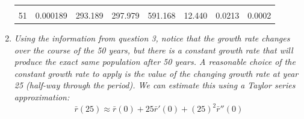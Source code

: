 \documentclass[]{book}
\begin{document}
\begin{enumerate}
\begin{longtable}[]{@{}llllllll@{}}
\begin{minipage}[t]{0.11\columnwidth}
  \strut
  \end{minipage}\tabularnewline
  \begin{minipage}[t]{0.02\columnwidth}\raggedright
  51\strut
  \end{minipage} & \begin{minipage}[t]{0.12\columnwidth}\raggedright
  0.000189\strut
  \end{minipage} & \begin{minipage}[t]{0.07\columnwidth}\raggedright
  293.189\strut
  \end{minipage} & \begin{minipage}[t]{0.07\columnwidth}\raggedright
  297.979\strut
  \end{minipage} & \begin{minipage}[t]{0.10\columnwidth}\raggedright
  591.168\strut
  \end{minipage} & \begin{minipage}[t]{0.20\columnwidth}\raggedright
  12.440\strut
  \end{minipage} & \begin{minipage}[t]{0.10\columnwidth}\raggedright
  0.0213\strut
  \end{minipage} & \begin{minipage}[t]{0.11\columnwidth}\raggedright
  0.0002\strut
  \end{minipage}\tabularnewline
  \bottomrule
  \end{longtable}
\item
  \emph{Using the information from question 3, notice that the growth rate changes over the course of the 50 years, but there is a constant growth rate that will produce the exact same population after 50 years. A reasonable choice of the constant growth rate to apply is the value of the changing growth rate at year 25 (half-way through the period). We can estimate this using a Taylor series approximation:} \[ \bar{r}(25) \approx \bar{r}(0) + 25\bar{r}'(0) + (25)^2 \bar{r}''(0) \]


\end{enumerate}
\end{document}

